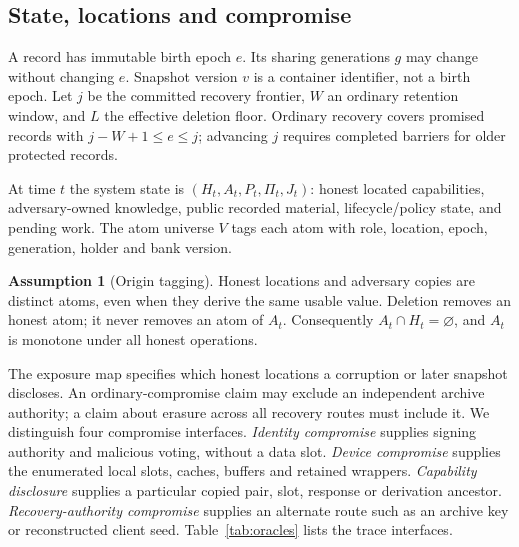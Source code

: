 \documentclass[pdflatex,sn-mathphys-num]{sn-jnl}
\theoremstyle{plain}
\theoremstyle{definition}
\newtheorem{assumption}{Assumption}
\begin{document}
\subsection{State, locations and compromise}
A record has immutable birth epoch $e$. Its sharing generations $g$ may change without changing $e$. Snapshot version $v$ is a container identifier, not a birth epoch. Let $j$ be the committed recovery frontier, $W$ an ordinary retention window, and $L$ the effective deletion floor. Ordinary recovery covers promised records with $j-W+1\le e\le j$; advancing $j$ requires completed barriers for older protected records.

At time $t$ the system state is $(H_t,A_t,P_t,\Pi_t,J_t)$: honest located capabilities, adversary-owned knowledge, public recorded material, lifecycle/policy state, and pending work. The atom universe $V$ tags each atom with role, location, epoch, generation, holder and bank version.

\begin{assumption}[Origin tagging]\label{ass:origin}
Honest locations and adversary copies are distinct atoms, even when they derive the same usable value. Deletion removes an honest atom; it never removes an atom of $A_t$. Consequently $A_t\cap H_t=\varnothing$, and $A_t$ is monotone under all honest operations.
\end{assumption}

The exposure map specifies which honest locations a corruption or later snapshot discloses. An ordinary-compromise claim may exclude an independent archive authority; a claim about erasure across all recovery routes must include it. We distinguish four compromise interfaces. \emph{Identity compromise} supplies signing authority and malicious voting, without a data slot. \emph{Device compromise} supplies the enumerated local slots, caches, buffers and retained wrappers. \emph{Capability disclosure} supplies a particular copied pair, slot, response or derivation ancestor. \emph{Recovery-authority compromise} supplies an alternate route such as an archive key or reconstructed client seed. Table~\ref{tab:oracles} lists the trace interfaces.
\end{document}
